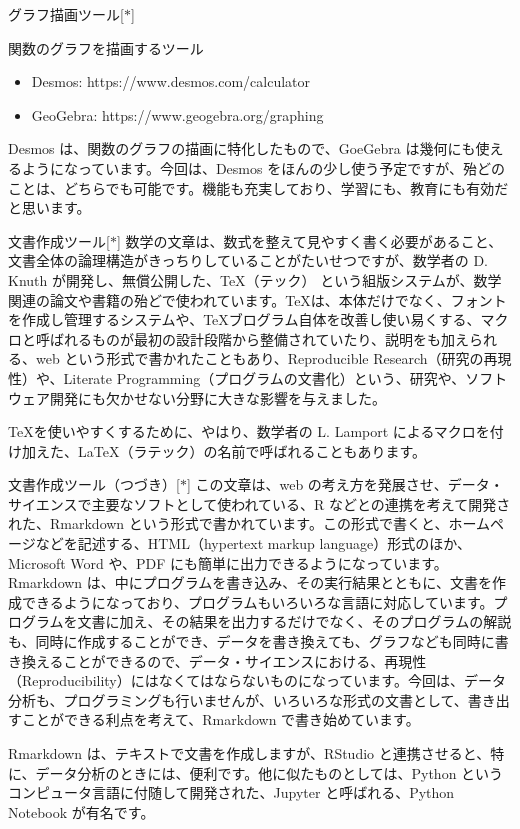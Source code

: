 \documentclass[10pt, dvipdfmx]{beamer}
\begin{document}
\begin{frame}{グラフ描画ツール\hfill [$\ast$]}

\begin{exampleblock}{関数のグラフを描画するツール}
\begin{itemize}
\item Desmos: https://www.desmos.com/calculator
\item GeoGebra: https://www.geogebra.org/graphing
\end{itemize}
\end{exampleblock}

\bigskip
Desmos は、関数のグラフの描画に特化したもので、GoeGebra は幾何にも使えるようになっています。今回は、Desmos をほんの少し使う予定ですが、殆どのことは、どちらでも可能です。機能も充実しており、学習にも、教育にも有効だと思います。
\end{frame}
\begin{frame}{文書作成ツール\hfill [$\ast$]}
数学の文章は、数式を整えて見やすく書く必要があること、文書全体の論理構造がきっちりしていることがたいせつですが、数学者の D. Knuth が開発し、無償公開した、\TeX（テック） という組版システムが、数学関連の論文や書籍の殆どで使われています。\TeX は、本体だけでなく、フォントを作成し管理するシステムや、\TeX ブログラム自体を改善し使い易くする、マクロと呼ばれるものが最初の設計段階から整備されていたり、説明をも加えられる、web という形式で書かれたこともあり、Reproducible Research（研究の再現性）や、Literate Programming（プログラムの文書化）という、研究や、ソフトウェア開発にも欠かせない分野に大きな影響を与えました。

\TeX を使いやすくするために、やはり、数学者の L. Lamport によるマクロを付け加えた、\LaTeX（ラテック）の名前で呼ばれることもあります。
\end{frame}
\begin{frame}{文書作成ツール（つづき）\hfill [$\ast$]}
この文章は、web の考え方を発展させ、データ・サイエンスで主要なソフトとして使われている、R などとの連携を考えて開発された、Rmarkdown という形式で書かれています。この形式で書くと、ホームページなどを記述する、HTML（hypertext markup language）形式のほか、Microsoft Word や、PDF にも簡単に出力できるようになっています。Rmarkdown は、中にプログラムを書き込み、その実行結果とともに、文書を作成できるようになっており、プログラムもいろいろな言語に対応しています。プログラムを文書に加え、その結果を出力するだけでなく、そのプログラムの解説も、同時に作成することができ、データを書き換えても、グラフなども同時に書き換えることができるので、データ・サイエンスにおける、再現性（Reproducibility）にはなくてはならないものになっています。今回は、データ分析も、プログラミングも行いませんが、いろいろな形式の文書として、書き出すことができる利点を考えて、Rmarkdown で書き始めています。

Rmarkdown は、テキストで文書を作成しますが、RStudio と連携させると、特に、データ分析のときには、便利です。他に似たものとしては、Python というコンピュータ言語に付随して開発された、Jupyter と呼ばれる、Python Notebook が有名です。
\end{frame}
\end{document}
